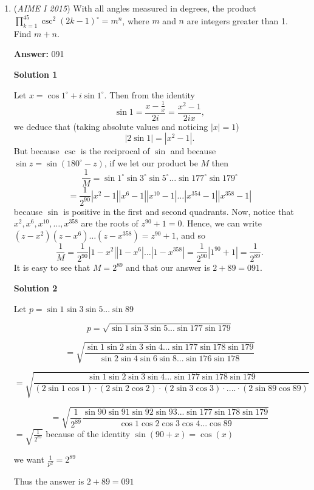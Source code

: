 \begin{enumerate}
	\item (\textit{AIME I 2015}) With all angles measured in degrees, the product $\prod_{k=1}^{45} \csc^2(2k-1)^\circ=m^n$, where $m$ and $n$ are integers greater than 1. Find $m+n$.


 



 
 \textbf{Answer: }091



\textbf{Solution 1}

Let $x = \cos 1^\circ + i \sin 1^\circ$. Then from the identity
 \[\sin 1 = \frac{x - \frac{1}{x}}{2i} = \frac{x^2 - 1}{2 i x},\]we deduce that (taking absolute values and noticing $|x| = 1$)
 \[|2\sin 1| = |x^2 - 1|.\]But because $\csc$ is the reciprocal of $\sin$ and because $\sin z = \sin (180^\circ - z)$, if we let our product be $M$ then
 \[\frac{1}{M} = \sin 1^\circ \sin 3^\circ \sin 5^\circ \dots \sin 177^\circ \sin 179^\circ\]
 \[= \frac{1}{2^{90}} |x^2 - 1| |x^6 - 1| |x^{10} - 1| \dots |x^{354} - 1| |x^{358} - 1|\]because $\sin$ is positive in the first and second quadrants. Now, notice that $x^2, x^6, x^{10}, \dots, x^{358}$ are the roots of $z^{90} + 1 = 0.$ Hence, we can write $(z - x^2)(z - x^6)\dots (z - x^{358}) = z^{90} + 1$, and so
 \[\frac{1}{M} = \dfrac{1}{2^{90}}|1 - x^2| |1 - x^6| \dots |1 - x^{358}| = \dfrac{1}{2^{90}} |1^{90} + 1| = \dfrac{1}{2^{89}}.\]It is easy to see that $M = 2^{89}$ and that our answer is $2 + 89 = \boxed{091}$.

 



\textbf{Solution 2}

Let $p=\sin1\sin3\sin5...\sin89$

 \[p=\sqrt{\sin1\sin3\sin5...\sin177\sin179}\]

 \[=\sqrt{\frac{\sin1\sin2\sin3\sin4...\sin177\sin178\sin179}{\sin2\sin4\sin6\sin8...\sin176\sin178}}\]

 \[=\sqrt{\frac{\sin1\sin2\sin3\sin4...\sin177\sin178\sin179}{(2\sin1\cos1)\cdot(2\sin2\cos2)\cdot(2\sin3\cos3)\cdot....\cdot(2\sin89\cos89)}}\]

 \[=\sqrt{\frac{1}{2^{89}}\frac{\sin90\sin91\sin92\sin93...\sin177\sin178\sin179}{\cos1\cos2\cos3\cos4...\cos89}}\]
$=\sqrt{\frac{1}{2^{89}}}$ because of the identity $\sin(90+x)=\cos(x)$

 we want $\frac{1}{p^2}=2^{89}$

 Thus the answer is $2+89=\boxed{091}$





\end{enumerate}
